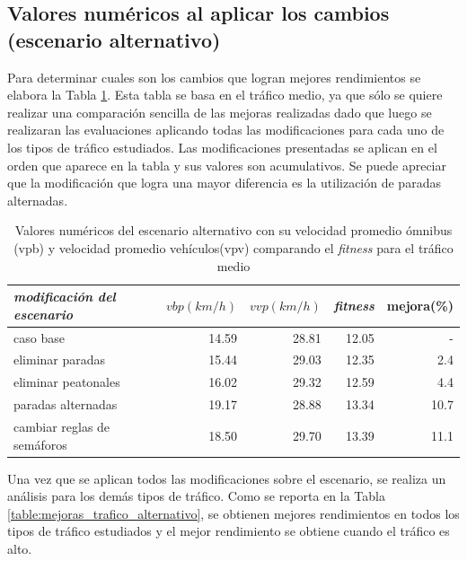 \subsection{Valores numéricos al aplicar los cambios (escenario alternativo)}

Para determinar cuales son los cambios que logran mejores rendimientos se elabora la Tabla \ref{table:resultado_alternativo}. Esta tabla se basa en el tráfico medio, ya que sólo se quiere realizar una comparación sencilla de las mejoras realizadas dado que luego se realizaran las evaluaciones aplicando todas las modificaciones para cada uno de los tipos de tráfico estudiados. Las modificaciones presentadas se aplican en el orden que aparece en la tabla y sus valores son acumulativos. Se puede apreciar que la modificación que logra una mayor diferencia es la utilización de paradas alternadas.


\begin{table}[H]
	\renewcommand{\arraystretch}{1.2}
	\caption[Valores numéricos del escenario alternativo]{Valores numéricos del escenario alternativo con su velocidad promedio ómnibus (vpb) y velocidad promedio vehículos(vpv) comparando el \emph{fitness} para el tráfico medio }
	\label{table:resultado_alternativo}
	\centering
	\begin{tabular}{lrrrr }
		\hline
		\textit{modificación del escenario}&
		$vbp(km/h)$& 
		$vvp(km/h)$ & 
		\emph{fitness} &
		mejora(\%)
		\\ 
		\hline
		caso base & 14.59  & 28.81& 12.05 & -\\
		eliminar paradas & 15.44  & 29.03& 12.35 & 2.4\\
		eliminar peatonales  & 16.02  & 29.32& 12.59 & 4.4\\
		paradas alternadas  & 19.17  & 28.88& 13.34 & 10.7\\	
		cambiar reglas de semáforos  & 18.50  & 29.70& 13.39 & 11.1\\				
		\hline
	\end{tabular}
\end{table}

Una vez que se aplican todos las modificaciones sobre el escenario, se realiza un análisis para los demás tipos de tráfico. Como se reporta en la Tabla \ref{table:mejoras_trafico_alternativo}, se obtienen mejores rendimientos en todos los tipos de tráfico estudiados y el mejor rendimiento se obtiene cuando el tráfico es alto. 

